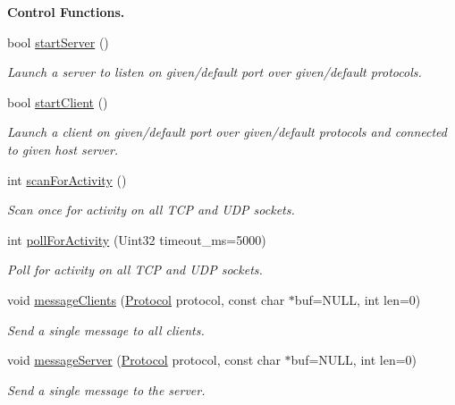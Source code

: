 \begin{Indent}{\bf Control Functions.}\par
\begin{DoxyCompactItemize}
\item 
bool \hyperlink{classNetManager_ae6a832ed2ede5f5407b75abc584269b8}{start\-Server} ()
\begin{DoxyCompactList}\small\item\em Launch a server to listen on given/default port over given/default protocols. \end{DoxyCompactList}\item 
bool \hyperlink{classNetManager_ab5b2ae812e37abbb03be5b604e34a60d}{start\-Client} ()
\begin{DoxyCompactList}\small\item\em Launch a client on given/default port over given/default protocols and connected to given host server. \end{DoxyCompactList}\item 
int \hyperlink{classNetManager_a2a4cfbc19eff3bb0692d704af706eb9f}{scan\-For\-Activity} ()
\begin{DoxyCompactList}\small\item\em Scan once for activity on all T\-C\-P and U\-D\-P sockets. \end{DoxyCompactList}\item 
int \hyperlink{classNetManager_aadf13e08dc3b654992ed91ecea82756c}{poll\-For\-Activity} (Uint32 timeout\-\_\-ms=5000)
\begin{DoxyCompactList}\small\item\em Poll for activity on all T\-C\-P and U\-D\-P sockets. \end{DoxyCompactList}\item 
void \hyperlink{classNetManager_acc00d7a5701d910fd572ebe5fd30f5fb}{message\-Clients} (\hyperlink{NetManager_8h_a9af285d1232beed01f31aac5d3a5469f}{Protocol} protocol, const char $\ast$buf=N\-U\-L\-L, int len=0)
\begin{DoxyCompactList}\small\item\em Send a single message to all clients. \end{DoxyCompactList}\item 
void \hyperlink{classNetManager_a8bcbcfe3c01917c2211b692cf6615177}{message\-Server} (\hyperlink{NetManager_8h_a9af285d1232beed01f31aac5d3a5469f}{Protocol} protocol, const char $\ast$buf=N\-U\-L\-L, int len=0)
\begin{DoxyCompactList}\small\item\em Send a single message to the server. \end{DoxyCompactList}\item 

\end{DoxyCompactItemize}
\end{Indent}
